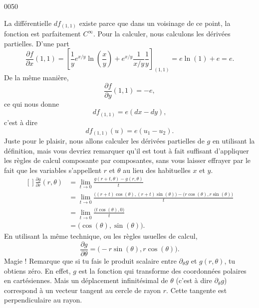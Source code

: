 
\begin{corrige}{0050}

La différentielle $df_{(1,1)}$ existe parce que dans un voisinage de ce point, la fonction est parfaitement $ C^{\infty}$. Pour la calculer, nous calculons les dérivées partielles. D'une part
\begin{equation}
	\frac{ \partial f }{ \partial x }(1,1)=\left[ \frac{1}{ y } e^{x/y}\ln(\frac{ x }{ y })+ e^{x/y}\frac{1}{ x/y }\frac{1}{ y } \right]_{(1,1)}=e\ln(1)+e=e.
\end{equation}
De la même manière,
\begin{equation}
	\frac{ \partial f }{ \partial y }(1,1)=-e,
\end{equation}
ce qui nous donne
\begin{equation}
	df_{(1,1)}=e(dx-dy),
\end{equation}
c'est à dire
\begin{equation}
	df_{(1,1)}(u)=e(u_1-u_2).
\end{equation}
Juste pour le plaisir, nous allons calculer les dérivées partielles de $g$ en utilisant la définition, mais vous devriez remarquer qu'il est tout à fait suffisant d'appliquer les règles de calcul composante par composantes, sans vous laisser effrayer par le fait que les variables s'appellent $r$ et $\theta$ au lieu des habituelles $x$ et $y$.
\begin{equation}
	\begin{aligned}[]
		\frac{ \partial g }{ \partial r }(r,\theta)
			&=	\lim_{t\to 0}\frac{ g(r+t,\theta)-g(r,\theta) }{ t }\\
			&=	\lim_{t\to 0}\frac{ \big( (r+t)\cos(\theta),(r+t)\sin(\theta) \big)-\big( r\cos(\theta),r\sin(\theta) \big) }{ t }\\
			&=	\lim_{t\to 0}\frac{ \big( t\cos(\theta),0 \big) }{ t }\\
			&=	\big( \cos(\theta),\sin(\theta) \big).
	\end{aligned}
\end{equation}
En utilisant la même technique, ou les règles usuelles de calcul,
\begin{equation}
	\frac{ \partial g }{ \partial \theta }=\big( -r\sin(\theta),r\cos(\theta) \big).
\end{equation}
Magie ! Remarque que si tu fais le produit scalaire entre $\partial_{\theta}g$ et $g(r,\theta)$, tu obtiens zéro. En effet, $g$ est la fonction qui transforme des coordonnées polaires en cartésiennes. Mais un déplacement infinitésimal de $\theta$ (c'est à dire $\partial_{\theta}g$) correspond à un vecteur tangent au cercle de rayon $r$. Cette tangente est perpendiculaire au rayon.


\end{corrige}
